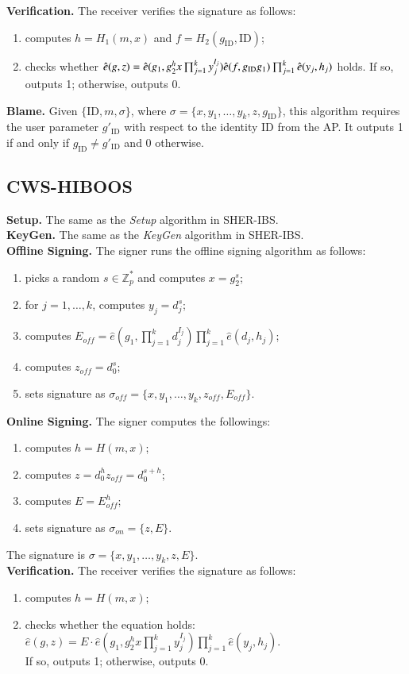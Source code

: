 \documentclass[letter]{ieice}
\begin{document}
\textbf{Verification.} The receiver verifies the signature as follows:
\begin{enumerate}
\item computes $h = H_1(m, x)$ and $f = H_2(g_\mathrm{ID}, \mathrm{ID})$;
\item checks whether $\hat{e}(g, z) = \hat{e}(g_1, g_2^hx \prod_{j=1}^k y_j^{I_j})\hat{e}(f, g_{\mathrm{ID}}g_1)\\ \prod_{j=1}^k \hat{e}(y_j, h_j)$ holds.
If so, outputs 1; otherwise, outputs 0.
\end{enumerate}
\textbf{Blame.} 
Given $\{\mathrm{ID}, m, \sigma\}$, where $\sigma = \{x, y_1, \ldots, y_k, z, g_{\mathrm{ID}}\}$, this algorithm requires the user parameter $g'_{\mathrm{ID}}$ with respect to the identity ID from the AP. 
It outputs 1 if and only if $g_{\mathrm{ID}} \neq g'_{\mathrm{ID}}$ and 0 otherwise.

\subsection{CWS-HIBOOS } \label{sec-hiboos}
\textbf{Setup.} 
The same as the \emph{Setup} algorithm in SHER-IBS.
\\
\textbf{KeyGen.} 
The same as the \emph{KeyGen} algorithm in SHER-IBS.
\\
\textbf{Offline Signing.} 
The signer runs the offline signing algorithm as follows:
\begin{enumerate}
\item picks a random $s \in \mathbb{Z}_p^*$ and computes $x = g_2^s$;
\item for $j = 1, \ldots, k$, computes $y_j = d_j^{s}$;
\item computes $E_{off} = \hat{e}(g_1, \prod_{j=1}^{k} d_j^{I_j})\prod_{j=1}^{k} \hat{e}(d_j, h_j)$;
\item computes $z_{off} = d_0^s$;
\item sets signature as $\sigma_{off} = \{x, y_1, \ldots, y_k, z_{off}, E_{off}\}$.
\end{enumerate}
\textbf{Online Signing.}
The signer computes the followings:
\begin{enumerate}
\item computes  $h = H(m, x)$;
\item computes $z = d_0^{h} z_{off} =  d_0^{s+h}$;
\item computes $E = E_{off}^h$;
\item sets signature as $\sigma_{on} = \{z, E\}$.
\end{enumerate}
\par
The signature is $\sigma = \{x, y_1, \ldots, y_k, z, E\}$.
\\
\textbf{Verification.} The receiver verifies the signature as follows:
\begin{enumerate}
\item computes $h = H(m, x)$;
\item checks whether the equation holds:\\
$\hat{e}(g, z) = E \cdot \hat{e}(g_1, g_2^hx\prod_{j=1}^k y_j^{I_j})\prod_{j=1}^k \hat{e}(y_j, h_j)$.\\
If so, outputs 1; otherwise, outputs 0.
\end{enumerate}
\par
\end{document}
